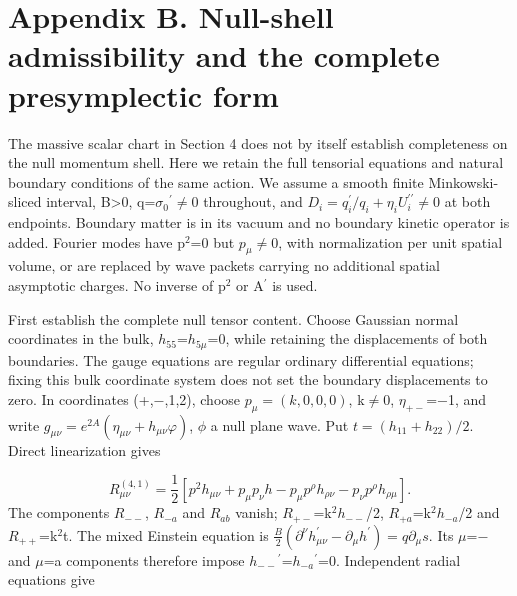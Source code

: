 \documentclass[11pt,a4paper]{article}
\begin{document}
\section*{Appendix B. Null-shell admissibility and the complete presymplectic form}
The massive scalar chart in Section 4 does not by itself establish completeness on the null momentum shell. Here we retain the full tensorial equations and natural boundary conditions of the same action. We assume a smooth finite Minkowski-sliced interval, B>0, q=\ensuremath{\sigma}\ensuremath{{}_{0}}\ensuremath{{}^{\prime}}\ensuremath{\ne}0 throughout, and \ensuremath{D_i=q_i^{\prime}/q_i+\eta_iU_i^{\prime\prime}\ne0} at both endpoints. Boundary matter is in its vacuum and no boundary kinetic operator is added. Fourier modes have p\ensuremath{{}^{2}}=0 but \ensuremath{p_\mu}\ensuremath{\ne}0, with normalization per unit spatial volume, or are replaced by wave packets carrying no additional spatial asymptotic charges. No inverse of p\ensuremath{{}^{2}} or A\ensuremath{{}^{\prime}} is used.

First establish the complete null tensor content. Choose Gaussian normal coordinates in the bulk, \ensuremath{h_{55}}=\ensuremath{h_{5\mu}}=0, while retaining the displacements of both boundaries. The gauge equations are regular ordinary differential equations; fixing this bulk coordinate system does not set the boundary displacements to zero. In coordinates (+,\ensuremath{-},1,2), choose \ensuremath{p_\mu=(k,0,0,0)}, k\ensuremath{\ne}0, \ensuremath{\eta_{+-}}=\ensuremath{-}1, and write \ensuremath{g_{\mu\nu}=e^{2A}(\eta_{\mu\nu}+h_{\mu\nu}\varphi)}, \ensuremath{\phi} a null plane wave. Put \ensuremath{t=(h_{11}+h_{22})/2}. Direct linearization gives

\begin{equation}
R^{(4,1)}_{\mu\nu}=\frac12[p^2h_{\mu\nu}+p_\mu p_\nu h-p_\mu p^\rho h_{\rho\nu}-p_\nu p^\rho h_{\rho\mu}].\tag{B1}
\end{equation}
The components \ensuremath{R_{--}}, \ensuremath{R_{-a}} and \ensuremath{R_{ab}} vanish; \ensuremath{R_{+-}}=k\ensuremath{{}^{2}}\ensuremath{h_{--}}/2, \ensuremath{R_{+a}}=k\ensuremath{{}^{2}}\ensuremath{h_{-a}}/2 and \ensuremath{R_{++}}=k\ensuremath{{}^{2}}t. The mixed Einstein equation is \ensuremath{\frac{B}{2}(\partial^\nu h_{\mu\nu}^{\prime}-\partial_\mu h^{\prime})=q\partial_\mu s}. Its \ensuremath{\mu}=\ensuremath{-} and \ensuremath{\mu}=a components therefore impose \ensuremath{h_{--}}\ensuremath{{}^{\prime}}=\ensuremath{h_{-a}}\ensuremath{{}^{\prime}}=0. Independent radial equations give
\end{document}
